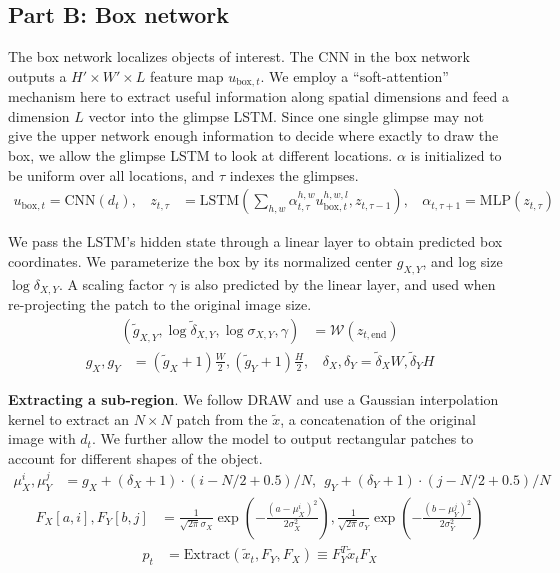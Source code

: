 \subsection{Part B: Box network}

The box network localizes objects of interest. The CNN in the box network
outputs a $H' \times W' \times L$ feature map $u_{\text{box}, t}$. We employ a
``soft-attention'' mechanism here to extract useful information along spatial
dimensions and feed a dimension $L$ vector into the glimpse LSTM. Since one
single glimpse may not give the upper network enough information to decide
where exactly to draw the box, we allow the glimpse LSTM to look at different
locations.  $\alpha$ is  initialized to be uniform over all locations, and
$\tau$ indexes the glimpses.
\vspace{-1pt}
\begin{align}
u_{\text{box},t} = \text{CNN}(d_t), \ \ \ \
z_{t, \tau} &= \text{LSTM} (
\sum_{h, w} \alpha^{h, w}_{t, \tau} u^{h,w,l}_{\text{box},t}, z_{t, \tau-1} ), \ \ \ \
\alpha_{t, \tau+1} = \text{MLP}(z_{t, \tau})
\end{align}
\vspace{-6pt}

We pass the LSTM's hidden state through a linear layer to obtain predicted
box coordinates. We parameterize the box by its normalized center
$g_{X,Y}$, and log size $\log \delta_{X,Y}$. A scaling factor $\gamma$ is
also predicted by the linear layer, and used when re-projecting the patch
to the original image size.
\vspace{-1pt}
\begin{align}
(\tilde{g}_{X,Y}, \log \tilde{\delta}_{X,Y}, \log \sigma_{X,Y}, \gamma) &= 
\mathcal{W}(z_{t, \text{end}})
\end{align}
\begin{align}
g_X, g_Y &= (\tilde{g}_X+1)\frac{W}{2}, (\tilde{g}_Y+1)\frac{H}{2}, \ \ \ \  
\delta_X, \delta_Y = \tilde{\delta}_X W, \tilde{\delta}_Y H
\end{align}
\vspace{-6pt}

\textbf{Extracting a sub-region}. We follow DRAW \cite{gregor15draw} and use a
Gaussian interpolation kernel to extract an $N \times N$ patch from the
$\tilde{x}$, a concatenation of the original image with $d_t$. We further allow
the model to output rectangular patches to account for different shapes of the
object.
\begin{align}
\mu_X^i, \mu_Y^j &= g_X + (\delta_X + 1) \cdot (i - N / 2 + 0.5) / N, \ \  
g_Y + (\delta_Y + 1) \cdot (j - N / 2 + 0.5) / N
\end{align}
\begin{align}
F_X[a, i], F_Y[b, j] &= 
\frac{1}{\sqrt{2\pi} \sigma_X} \exp \left(- \frac{(a -
\mu_X^i)^2}{2\sigma_X^2} \right), 
\frac{1}{\sqrt{2\pi} \sigma_Y} \exp \left(- \frac{(b -
\mu_Y^j)^2}{2\sigma_Y^2} \right)
\end{align}
\begin{align}
p_t &= \text{Extract}(\tilde{x}_t, F_Y, F_X) \equiv F_Y^T \tilde{x}_t F_X
\end{align}

